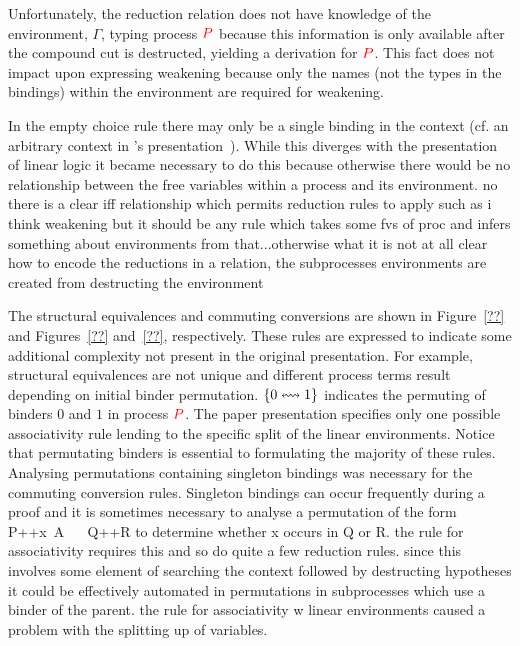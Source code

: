 Unfortunately, the reduction relation does not have knowledge of the
environment, $\Gamma$, typing process ${\color{red} P}$ because this information is
only available after the compound cut is destructed, yielding a derivation for
${\color{red} P}$. This fact does not impact upon expressing weakening because only the
names (not the types in the bindings) within the environment are required for
weakening.

In the empty choice rule there may only be a single binding in the context
(cf. an arbitrary context in \citeauthor{Wadler:2014}'s
presentation~\cite{Wadler:2014}).  While this diverges with the presentation of linear logic it became
necessary to do this because otherwise there would be no relationship between
the free variables within a process and its environment. no there is a clear
iff relationship which permits reduction rules to apply such as i think
weakening but it should be any rule which takes some fvs of proc and infers
something about environments from that...otherwise what it is not at all clear
how to encode the reductions in a relation, the subprocesses environments are
created from destructing the environment


%

%

%

The structural equivalences and commuting conversions are shown in
Figure~\ref{??} and Figures~\ref{??} and~\ref{??}, respectively. These rules
are expressed to indicate some additional complexity not present in the
original presentation. For example, structural equivalences are not unique and
different process terms result depending on initial binder
permutation. $\left\{{0}\leftrightsquigarrow{1}\right\}$ indicates the permuting of binders $0$ and $1$ in
process ${\color{red} P}$. The paper presentation specifies only one possible
associativity rule lending to the specific split of the linear environments.
Notice that permutating binders is essential to formulating the majority of
these rules. Analysing permutations containing singleton bindings was
necessary for the commuting conversion rules. Singleton bindings can occur
frequently during a proof and it is sometimes necessary to analyse a
permutation of the form P++x~A ~~ Q++R to determine whether x occurs in Q or
R. the rule for associativity requires this and so do quite a few reduction
rules. since this involves some element of searching the context followed by
destructing hypotheses it could be effectively automated in permutations in
subprocesses which use a binder of the parent. the rule for associativity w
linear environments caused a problem with the splitting up of variables.

